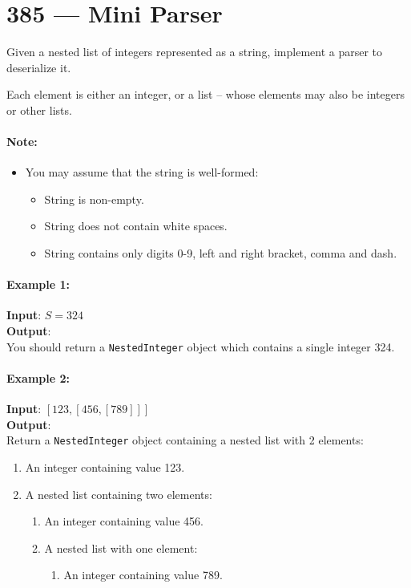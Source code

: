 \section{385 --- Mini Parser}
Given a nested list of integers represented as a string, implement a parser to deserialize it.

Each element is either an integer, or a list -- whose elements may also be integers or other lists.

\paragraph{Note:} 
\begin{itemize}
\item You may assume that the string is well-formed:
\begin{itemize}
\item String is non-empty.
\item String does not contain white spaces.
\item String contains only digits 0-9, left and right bracket, comma and dash.
\end{itemize}

\end{itemize}


\paragraph{Example 1:}
\begin{flushleft}
\textbf{Input}: $S=324$
\\
\textbf{Output}:
\\
You should return a \texttt{NestedInteger} object which contains a single integer 324.
\end{flushleft}

\paragraph{Example 2:}
\begin{flushleft}
\textbf{Input}: $[123,[456,[789]]]$
\\
\textbf{Output}:
\\
Return a \texttt{NestedInteger} object containing a nested list with 2 elements:
\begin{enumerate}
\item An integer containing value 123.
\item A nested list containing two elements:
\begin{enumerate}
\item An integer containing value 456.
\item A nested list with one element:
\begin{enumerate}
\item An integer containing value 789.
\end{enumerate}
\end{enumerate}
\end{enumerate}
\end{flushleft}

